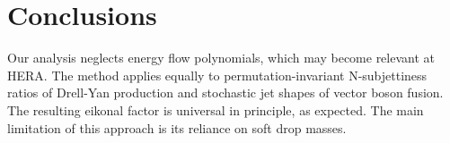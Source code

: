 \section{Conclusions}\label{sec:conclusions}

Our analysis neglects energy flow polynomials, which may become relevant
at HERA. The method applies equally to permutation-invariant
N-subjettiness ratios of Drell-Yan production and stochastic jet shapes
of vector boson fusion. The resulting eikonal factor is universal in
principle, as expected. The main limitation of this approach is its
reliance on soft drop masses.


